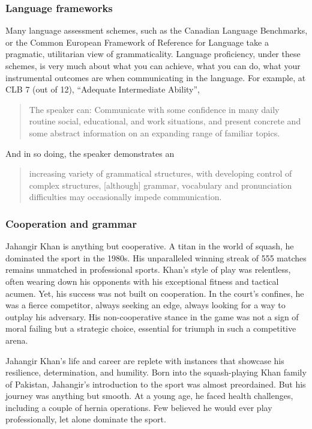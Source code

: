 \subsubsection{Language frameworks}

Many language assessment schemes, such as the Canadian Language Benchmarks, or the Common European Framework of Reference for Language take a pragmatic, utilitarian view of grammaticality. Language proficiency, under these schemes, is very much about what you can achieve, what you can do, what your instrumental outcomes are when communicating in the language. For example, at CLB 7 (out of 12), ``Adequate Intermediate Ability'', \begin{quote}
    The speaker can: Communicate with some confidence in many daily routine social, educational, and work situations, and present concrete and some abstract information on an expanding range of familiar topics.
\end{quote} And in so doing, the speaker demonstrates an \begin{quote} 
    increasing variety of grammatical structures, with developing control of complex structures, [although] grammar, vocabulary and pronunciation difficulties may occasionally impede communication.
\end{quote}

\subsubsection{Cooperation and grammar}

Jahangir Khan is anything but cooperative. A titan in the world of squash, he dominated the sport in the 1980s. His unparalleled winning streak of 555 matches remains unmatched in professional sports. Khan's style of play was relentless, often wearing down his opponents with his exceptional fitness and tactical acumen. Yet, his success was not built on cooperation. In the court's confines, he was a fierce competitor, always seeking an edge, always looking for a way to outplay his adversary. His non-cooperative stance in the game was not a sign of moral failing but a strategic choice, essential for triumph in such a competitive arena.

Jahangir Khan's life and career are replete with instances that showcase his resilience, determination, and humility. Born into the squash-playing Khan family of Pakistan, Jahangir's introduction to the sport was almost preordained. But his journey was anything but smooth. At a young age, he faced health challenges, including a couple of hernia operations. Few believed he would ever play professionally, let alone dominate the sport.

